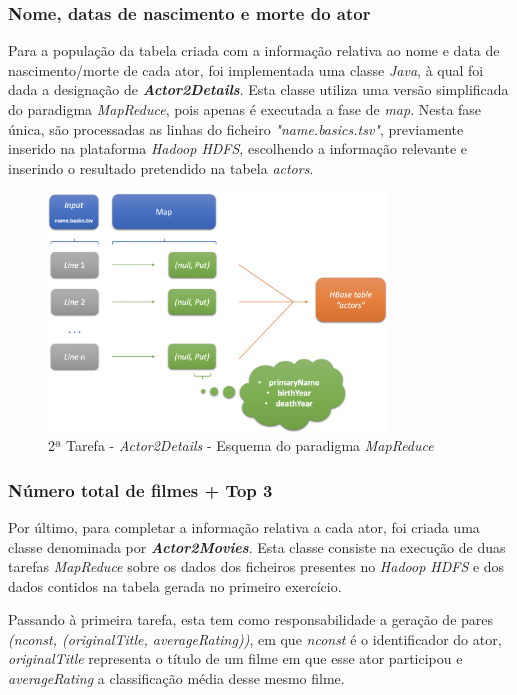 \documentclass[a4paper]{report}
\begin{document}
{			\subsubsection{Nome, datas de nascimento e morte do ator} \label{sssec:Task2-3-1}
			Para a população da tabela criada com a informação relativa ao nome e data de nascimento/morte de cada ator, foi implementada uma classe \textit{Java}, à qual foi dada a designação de \textbf{\textit{Actor2Details}}.
			Esta classe utiliza uma versão simplificada do paradigma \textit{MapReduce}, pois apenas é executada a fase de \textit{map}.
			Nesta fase única, são processadas as linhas do ficheiro \textit{"name.basics.tsv"}, previamente inserido na plataforma \textit{Hadoop HDFS}, escolhendo a informação relevante e inserindo o resultado pretendido na tabela \textit{actors}.
			\begin{figure}[H]
				\centering
				\includegraphics[width=0.8\textwidth]{Images/Task 2 - Actor2Details - MapReduce.png}
				\caption{2ª Tarefa - \textit{Actor2Details} - Esquema do paradigma \textit{MapReduce}}
				\label{fig:18}
			\end{figure}

			\subsubsection{Número total de filmes + Top 3} \label{sssec:Task2-3-2}
			Por último, para completar a informação relativa a cada ator, foi criada uma classe denominada por \textbf{\textit{Actor2Movies}}. Esta classe consiste na execução de duas tarefas \textit{MapReduce} sobre os dados dos ficheiros presentes no \textit{Hadoop HDFS} e dos dados contidos na tabela gerada no primeiro exercício.
			
			Passando à primeira tarefa, esta tem como responsabilidade a geração de pares \textit{(nconst, (originalTitle, averageRating))}, em que \textit{nconst} é o identificador do ator, \textit{originalTitle} representa o título de um filme em que esse ator participou e \textit{averageRating} a classificação média desse mesmo filme.
			
}
\end{document}

